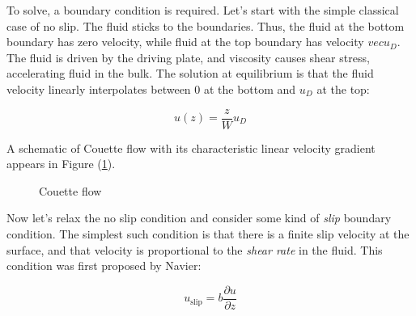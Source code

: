 \documentclass[12pt, a4paper, twoside, openright]{book}
\begin{document}
To solve, a boundary condition is required. Let's start with the simple classical case of no slip.  The fluid sticks to the boundaries.  Thus, the fluid at the bottom boundary has zero velocity, while fluid at the top boundary has velocity $vec{u}_{D}$. The fluid is driven by the driving plate, and viscosity causes shear stress, accelerating fluid in the bulk. The solution at equilibrium is that the fluid velocity linearly interpolates between 0 at the bottom and $u_{D}$ at the top:

\begin{equation}
u(z) = \frac{z}{W}u_{D}  
\end{equation}

A schematic of Couette flow with its characteristic linear velocity gradient appears in Figure (\ref{Couetteflow}).

\begin{figure}[ht]
\centering
{}
\caption{Couette flow} \label{Couetteflow}
\end{figure}

Now let's relax the no slip condition and consider some kind of \emph{slip} boundary condition. The simplest such condition is that there is a finite slip velocity at the surface, and that velocity is proportional to the \emph{shear rate} in the fluid. This condition was first proposed by Navier:

\begin{equation}
u_{\mathrm{slip}} = b \frac{\partial u}{\partial z}
\end{equation}
\end{document}
